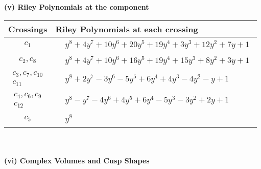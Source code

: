 \documentclass[1p]{elsarticle_modified}
\theoremstyle{definition}
\begin{document}
\newpage\renewcommand{\arraystretch}{1}
\flushleft \textbf{(v) Riley Polynomials at the component}\newline \\
\begin{tabular}{m{50pt}|m{274pt}}
Crossings & \hspace{64pt}Riley Polynomials at each crossing \\
\hline $$\begin{aligned}c_{1}\end{aligned}$$&$\begin{aligned}
&y^8+4 y^7+10 y^6+20 y^5+19 y^4+3 y^3+12 y^2+7 y+1
\end{aligned}$\\
\hline $$\begin{aligned}c_{2},c_{8}\end{aligned}$$&$\begin{aligned}
&y^8+4 y^7+10 y^6+16 y^5+19 y^4+15 y^3+8 y^2+3 y+1
\end{aligned}$\\
\hline $$\begin{aligned}c_{3},c_{7},c_{10}\\c_{11}\end{aligned}$$&$\begin{aligned}
&y^8+2 y^7-3 y^6-5 y^5+6 y^4+4 y^3-4 y^2- y+1
\end{aligned}$\\
\hline $$\begin{aligned}c_{4},c_{6},c_{9}\\c_{12}\end{aligned}$$&$\begin{aligned}
&y^8- y^7-4 y^6+4 y^5+6 y^4-5 y^3-3 y^2+2 y+1
\end{aligned}$\\
\hline $$\begin{aligned}c_{5}\end{aligned}$$&$\begin{aligned}
&y^8
\end{aligned}$\\
\hline
\end{tabular}\\~\\
\newpage\flushleft \textbf{(vi) Complex Volumes and Cusp Shapes}
\end{document}
